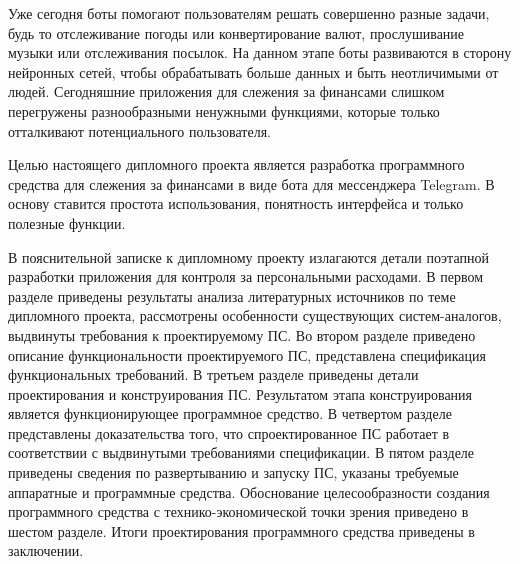 Уже сегодня боты помогают пользователям решать совершенно разные задачи, будь то отслеживание погоды или конвертирование валют, прослушивание музыки или отслеживания посылок. На данном этапе боты развиваются в сторону нейронных сетей, чтобы обрабатывать больше данных и быть неотличимыми от людей. Сегодняшние приложения для слежения за финансами слишком перегружены разнообразными ненужными функциями, которые только отталкивают потенциального пользователя.

Целью настоящего дипломного проекта является разработка программного средства для слежения за финансами в виде бота для мессенджера Telegram. В основу ставится простота использования, понятность интерфейса и только полезные функции.

В пояснительной записке к дипломному проекту излагаются детали поэтапной разработки приложения для контроля за персональными расходами. В первом разделе приведены результаты анализа литературных источников по теме дипломного проекта, рассмотрены особенности существующих систем-аналогов, выдвинуты требования к проектируемому ПС. Во втором разделе приведено описание функциональности проектируемого ПС, представлена спецификация функциональных требований. В третьем разделе приведены детали проектирования и конструирования ПС. Результатом этапа конструирования является функционирующее программное средство. В четвертом разделе представлены доказательства того, что спроектированное ПС работает в соответствии с выдвинутыми требованиями спецификации. В пятом разделе приведены сведения по развертыванию и запуску ПС, указаны требуемые аппаратные и программные средства. Обоснование целесообразности создания программного средства с технико-экономической точки зрения приведено в шестом разделе. Итоги проектирования программного средства приведены в заключении.